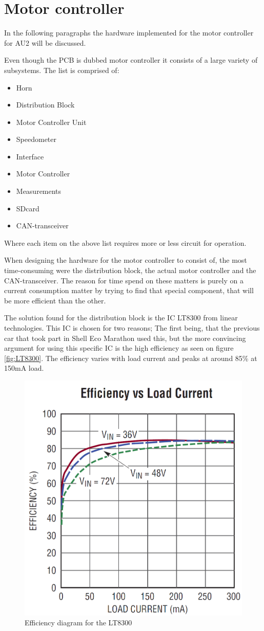 \section{Motor controller}
In the following paragraphs the hardware implemented for the motor controller for AU2 will be discussed. 

Even though the PCB is dubbed motor controller it consists of a large variety of subsystems. The list is comprised of: 

\begin{itemize}
	\item{Horn}
	\item{Distribution Block}
	\item{Motor Controller Unit}
	\item{Speedometer}
	\item{Interface}
	\item{Motor Controller}
	\item{Measurements}
	\item{SDcard}
	\item{CAN-transceiver}
\end{itemize}

Where each item on the above list requires more or less circuit for operation. 

When designing the hardware for the motor controller to consist of, the most time-consuming were the distribution block, the actual motor controller and the CAN-transceiver. The reason for time spend on these matters is purely on a current consumption matter by trying to find that special component, that will be more efficient than the other. 

The solution found for the distribution block is the IC LT8300\cite{LT8300} from linear technologies. This IC is chosen for two reasons; The first being, that the previous car that took part in Shell Eco Marathon used this, but the more convincing argument for using this specific IC is the high efficiency as seen on figure \vref{fig:LT8300}. The efficiency varies with load current and peaks at around 85\% at 150mA load.  

\begin{figure}[H]
	\centering
	\includegraphics[width=0.5\linewidth]{Hardware/Pictures/LT8300}
	\caption{Efficiency diagram for the LT8300}
	\label{fig:LT8300}
\end{figure}

